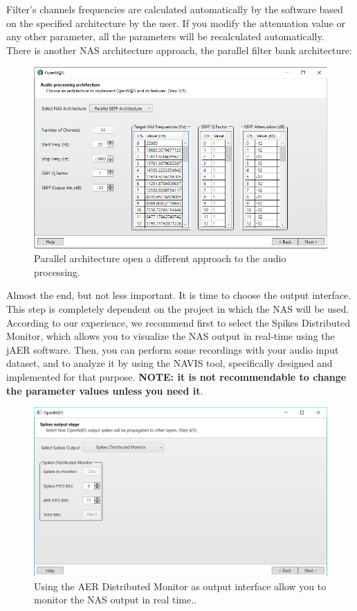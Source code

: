 Filter's channels frequencies are calculated automatically by the software based on the specified architecture by the user. If you modify the attenuation value or any other parameter, all the parameters will be recalculated automatically.\\

There is another NAS architecture approach, the parallel filter bank architecture:

\begin{figure}[H]
\centering
\includegraphics[width=1\textwidth]{images/Img21_S3_Arch_bis.PNG}
\caption{\label{fig:OpenNAS_s3_parallel}Parallel architecture open a different approach to the audio processing.}
\end{figure}

Almost the end, but not less important. It is time to choose the output interface. This step is completely dependent on the project in which the NAS will be used. According to our experience, we recommend first to select the Spikes Distributed Monitor, which allows you to visualize the NAS output in real-time using the jAER software. Then, you can perform some recordings with your audio input dataset, and to analyze it by using the NAVIS tool, specifically designed and implemented for that purpose. \textbf{NOTE: it is not recommendable to change the parameter values unless you need it}.

\begin{figure}[H]
\centering
\includegraphics[width=1\textwidth]{images/Img22_S4_OutInterface.PNG}
\caption{\label{fig:OpenNAS_s4_monitor}Using the AER Distributed Monitor as output interface allow you to monitor the NAS output in real time..}
\end{figure}

